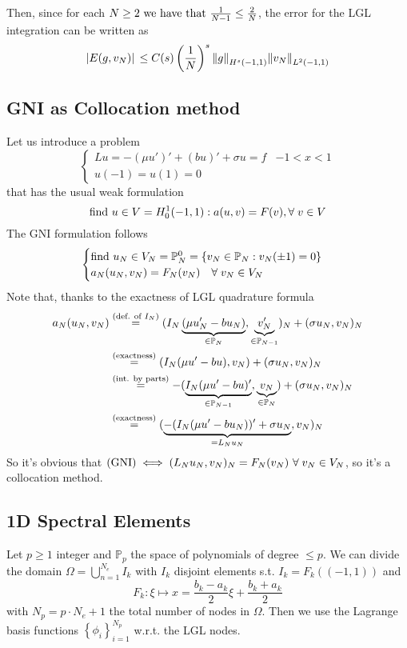 Then, since for each \(N\geq 2 \text{ we have that }\frac{1}{N-1} \leq \frac{2}{N}\), the error for the LGL integration can be written as 
\[
    \abs*{E(g,v_N)} \leq C(s)\left(\frac{1}{N}\right)^s \norm{g}_{H^s(-1,1)} \norm{v_N}_{L^2(-1,1)}
\]

\subsection{GNI as Collocation method}
Let us introduce a problem 
\[
    \begin{cases}
        Lu = -(\mu u')' + (bu)' + \sigma u =  f & -1 < x < 1 \\
        u(-1) = u(1) = 0
    \end{cases}
\]
that has the usual weak formulation 
\[
    \text{find } u \in V = H^1_0(-1,1): a(u,v) = F(v), \forall \; v \in V
\]
The GNI formulation follows 
\[
    \begin{cases}
        \text{find } u_N \in V_N = \mathbb{P}^0_N = \left\{v_N  \in \mathbb{P}_N : v_N(\pm 1) = 0\right\} \\
        a_N(u_N, v_N) = F_N(v_N) \quad \forall \; v_N \in V_N
    \end{cases}
\]
Note that, thanks to the exactness of LGL quadrature formula 
\begin{align*}
    a_N(u_N, v_N) &\overset{(\text{def. of }I_N)}{=} (I_N\underbrace{(\mu u'_N - bu_N)}_{\in \mathbb{P}_N}, \underbrace{v'_N}_{\in \mathbb{P}_{N-1}})_N + (\sigma u_N, v_N)_N \\
    &\overset{(\text{exactness})}{=} (I_N(\mu u' - b u), v_N) + (\sigma u_N, v_N)_N \\
    &\overset{(\text{int. by parts})}{=} -(\underbrace{I_N(\mu u' - b u)'}_{\in \mathbb{P}_{N-1}}, \underbrace{v_N}_{\in \mathbb{P}_N}) + (\sigma u_N, v_N)_N \\
    &\overset{(\text{exactness})}{=} (\underbrace{-(I_N(\mu u' - b u_N))' + \sigma u_N}_{= L_Nu_N}, v_N)_N
\end{align*}
So it's obvious that \((\txt{GNI}) \iff (L_Nu_N, v_N)_N = F_N(v_N) \ \forall \; v_N \in V_N\), so it's a collocation method.
\subsection{1D Spectral Elements}
Let \(p \geq 1\) integer and \(\mathbb{P}_p\) the space of polynomials of degree \(\leq p\). We can divide the domain \(\Omega = \bigcup_{n=1}^{N_e} I_k\) with \(I_k\) disjoint elements s.t. \(I_k = F_k ((-1,1))\) and 
\[
    F_k : \xi \mapsto x = \frac{b_k -a_k}{2}\xi + \frac{b_k+a_k}{2}
\]
with \(N_p = p\cdot N_e +1\) the total number of nodes in \(\Omega\). 
Then we use the Lagrange basis functions \(\left\{ \phi_i\right\}_{i=1}^{N_p}\) w.r.t. the LGL nodes.

